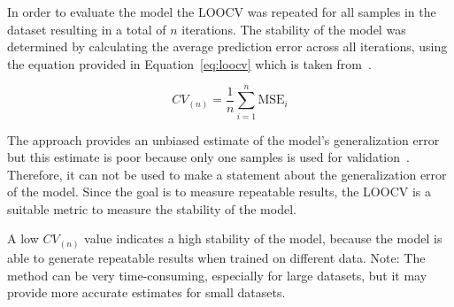 In order to evaluate the model the \ac{LOOCV} was repeated for all samples in
the dataset
resulting in a total of \(n\) iterations.
The stability of the model was determined by calculating the average
prediction error across all
iterations, using the equation provided in Equation~\ref{eq:loocv} which is
taken from~\cite[p.
201]{gareth2013introduction}.

\begin{tcolorbox}[arc=0pt,boxrule=0.5pt]
    \begin{equation}
        CV_{(n)} = \frac{1}{n} \sum_{i=1}^{n} \text{MSE}_{i}\label{eq:loocv}
    \end{equation}
\end{tcolorbox}

The approach provides an unbiased estimate of the model's generalization error
but this estimate is poor because only one samples is used for
validation~\cite[p.
201]{gareth2013introduction}.
Therefore, it can not be used to make a statement about the generalization
error of the model.
Since the goal is to measure repeatable results, the \ac{LOOCV} is a suitable
metric to measure
the stability of the model.

%

A low \(CV_{(n)}\) value indicates a high stability of the model, because the
model is able to
generate repeatable results when trained on different data.
Note: The method can be very time-consuming, especially for large datasets,
but it may provide
more accurate estimates for small datasets.



